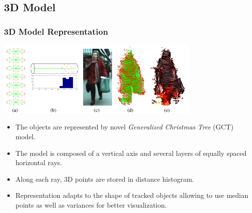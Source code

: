 \documentclass{beamer}
\begin{document}
\subsection{3D Model}
\begin{frame}
\frametitle{3D Model Representation} 

\begin{center}
  \includegraphics[width=10cm]{3D_model.pdf}
\end{center}
\begin{itemize}
  \item The objects are represented by novel \emph{Generalized Christmas Tree} (GCT) model.
  \item The model is composed of a vertical axis and several layers of equally spaced horizontal rays.
  \item  Along each ray, 3D points are stored in distance histogram.
  \item  Representation adapts to the shape of tracked objects allowing to use median points as well as variances for better visualization. 
\end{itemize}
\end{frame}



\end{document}
